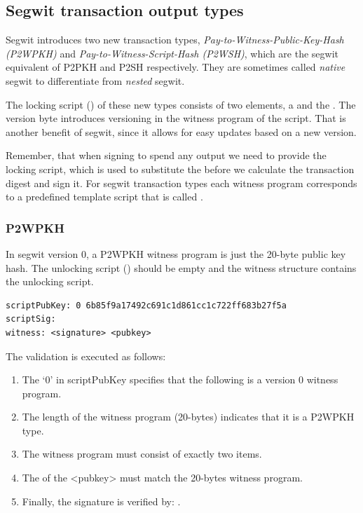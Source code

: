\subsection*{Segwit transaction output types}
Segwit introduces two new transaction types, \emph{Pay-to-Witness-Public-Key-Hash (P2WPKH)} and \emph{Pay-to-Witness-Script-Hash (P2WSH)}, which are the segwit equivalent of P2PKH and P2SH respectively. They are sometimes called \emph{native} segwit to differentiate from \emph{nested} segwit.

The locking script () of these new types consists of two elements, a  and the . The version byte introduces versioning in the witness program of the script. That is another benefit of segwit, since it allows for easy updates based on a new version.

Remember, that when signing to spend any output we need to provide the locking script, which is used to substitute the  before we calculate the transaction digest and sign it. For segwit transaction types each witness program corresponds to a predefined template script that is called .

\subsubsection*{P2WPKH}
In segwit version 0, a P2WPKH witness program is just the 20-byte public key hash. The unlocking script () should be empty and the witness structure contains the unlocking script.

\begin{emphbox}
\begin{lstlisting}[style=Pseudomath]
scriptPubKey: 0 6b85f9a17492c691c1d861cc1c722ff683b27f5a
scriptSig:
witness: <signature> <pubkey>
\end{lstlisting}
\end{emphbox}

The validation is executed as follows:
\begin{enumerate}
\item The `0' in scriptPubKey specifies that the following is a version 0 witness program.
\item The length of the witness program (20-bytes) indicates that it is a P2WPKH type.
\item The witness program must consist of exactly two items.
\item The  of the <pubkey> must match the 20-bytes witness program.
\item Finally, the signature is verified by: .
\end{enumerate}

